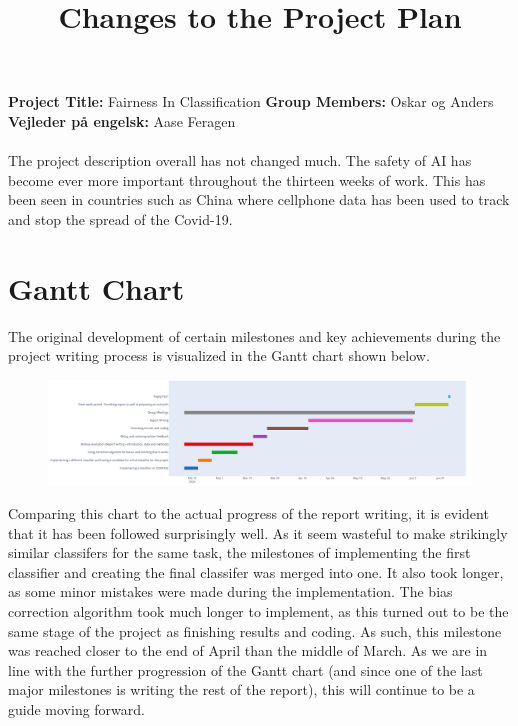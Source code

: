\documentclass[11pt, fleqn]{article}
\title{Changes to the Project Plan}
\date{}
\begin{document}
	\maketitle
	\noindent
	\vspace*{-1.4cm}
	\noindent
	\textbf{Project Title:} Fairness In Classification \newline \noindent
	\textbf{Group Members:} Oskar og Anders \newline  \noindent
	\textbf{Vejleder på engelsk:} Aase Feragen \noindent
	\\\\
	
		The project description overall has not changed much. The safety of AI has become ever more important throughout the thirteen weeks of work. This has been seen in countries such as China where cellphone data has been used to track and stop the spread of the Covid-19. 
		
	\section*{Gantt Chart}
	\noindent The original development of certain milestones and key achievements during the project writing process is visualized in the Gantt chart shown below. 
	\begin{figure}[H]
		\centering
		\includegraphics[width=\linewidth]{Gantt}
	\end{figure}

	Comparing this chart to the actual progress of the report writing, it is evident that it has been followed surprisingly well. As it seem wasteful to make strikingly similar classifers for the same task, the milestones of implementing the first classifier and creating the final classifer was merged into one. It also took longer, as some minor mistakes were made during the implementation. The bias correction algorithm took much longer to implement, as this turned out to be the same stage of the project as finishing results and coding. As such, this milestone was reached closer to the end of April than the middle of March. As we are in line with the further progression of the Gantt chart (and since one of the last major milestones is writing the rest of the report), this will continue to be a guide moving forward.
	
\end{document}
